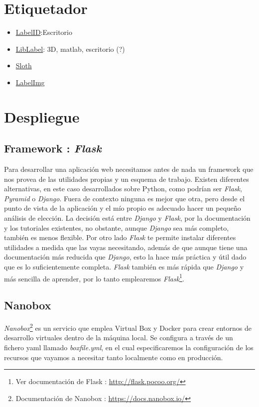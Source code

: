 
\section{Etiquetador}


\begin{itemize}
	\item \href{https://sweppner.github.io/labeld/}{LabelID}:Escritorio
	\item \href{http://www.cvlibs.net/software/liblabel/}{LibLabel}: 3D, matlab, escritorio (?)
	\item \href{https://cvhci.anthropomatik.kit.edu/~baeuml/projects/a-universal-labeling-tool-for-computer-vision-sloth/}{Sloth}
	\item \href{https://github.com/tzutalin/labelImg}{LabelImg}
\end{itemize}

\section{Despliegue}
\subsection{Framework : \textit{Flask}}
Para desarrollar una aplicación web necesitamos antes de nada un framework que nos provea de las utilidades propias y un esquema de trabajo. Existen diferentes alternativas, en este caso desarrollados sobre Python, como podrían ser \textit{Flask}, \textit{Pyramid} o \textit{Django}. Fuera de contexto ninguna es mejor que otra, pero desde el punto de vista de la aplicación y el mío propio es adecuado hacer un pequeño análisis de elección.
La decisión está entre\textit{ Django} y \textit{Flask}, por la documentación y los tutoriales existentes, no obstante, aunque \textit{Django} sea más completo, también es menos flexible. Por otro lado \textit{Flask} te permite instalar diferentes utilidades a medida que las vayas necesitando, además de que aunque tiene una documentación más reducida que \textit{Django}, esto la hace más práctica y útil dado que es lo suficientemente completa. \textit{Flask} también es más rápida que \textit{Django} y más sencilla de aprender, por lo tanto emplearemos \textit{Flask}\footnote{Ver documentación de Flask : \url{http://flask.pocoo.org/}}.
\subsection{Nanobox}
\textit{Nanobox}\footnote{Documentación de Nanobox : \url{https://docs.nanobox.io/}} es un servicio que emplea Virtual Box y Docker para crear entornos de desarrollo virtuales dentro de la máquina local. Se configura a través de un fichero yaml llamado \textit{boxfile.yml}, en el cual especificaremos la configuración de los recursos que vayamos a necesitar tanto localmente como en producción. 
